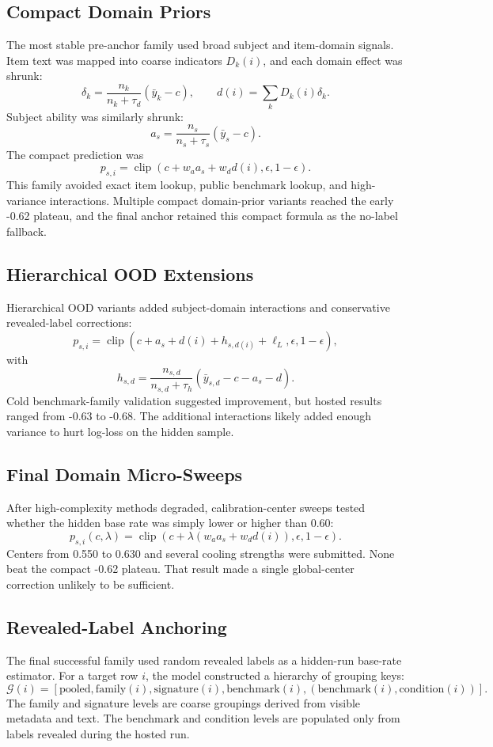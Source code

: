 \documentclass[11pt]{article}
\begin{document}
\subsection{Compact Domain Priors}
The most stable pre-anchor family used broad subject and item-domain signals. Item text was mapped into coarse indicators \(D_k(i)\), and each domain effect was shrunk:
\[
  \delta_k=\frac{n_k}{n_k+\tau_d}(\bar y_k-c),
  \qquad
  d(i)=\sum_k D_k(i)\delta_k.
\]
Subject ability was similarly shrunk:
\[
  a_s=\frac{n_s}{n_s+\tau_s}(\bar y_s-c).
\]
The compact prediction was
\[
  p_{s,i}=\operatorname{clip}\left(c+w_a a_s+w_d d(i),\epsilon,1-\epsilon\right).
\]
This family avoided exact item lookup, public benchmark lookup, and high-variance interactions. Multiple compact domain-prior variants reached the early -0.62 plateau, and the final anchor retained this compact formula as the no-label fallback.

\subsection{Hierarchical OOD Extensions}
Hierarchical OOD variants added subject-domain interactions and conservative revealed-label corrections:
\[
  p_{s,i}
  =
  \operatorname{clip}\left(c+a_s+d(i)+h_{s,d(i)}+\ell_L,\epsilon,1-\epsilon\right),
\]
with
\[
  h_{s,d}
  =
  \frac{n_{s,d}}{n_{s,d}+\tau_h}
  \left(\bar y_{s,d}-c-a_s-d\right).
\]
Cold benchmark-family validation suggested improvement, but hosted results ranged from -0.63 to -0.68. The additional interactions likely added enough variance to hurt log-loss on the hidden sample.

\subsection{Final Domain Micro-Sweeps}
After high-complexity methods degraded, calibration-center sweeps tested whether the hidden base rate was simply lower or higher than 0.60:
\[
  p_{s,i}(c,\lambda)
  =
  \operatorname{clip}\left(c+\lambda(w_a a_s+w_d d(i)),\epsilon,1-\epsilon\right).
\]
Centers from 0.550 to 0.630 and several cooling strengths were submitted. None beat the compact -0.62 plateau. That result made a single global-center correction unlikely to be sufficient.

\subsection{Revealed-Label Anchoring}
The final successful family used random revealed labels as a hidden-run base-rate estimator. For a target row \(i\), the model constructed a hierarchy of grouping keys:
\[
  \mathcal{G}(i)=
  [
    \mathrm{pooled},
    \mathrm{family}(i),
    \mathrm{signature}(i),
    \mathrm{benchmark}(i),
    (\mathrm{benchmark}(i),\mathrm{condition}(i))
  ].
\]
The family and signature levels are coarse groupings derived from visible metadata and text. The benchmark and condition levels are populated only from labels revealed during the hosted run.
\end{document}

